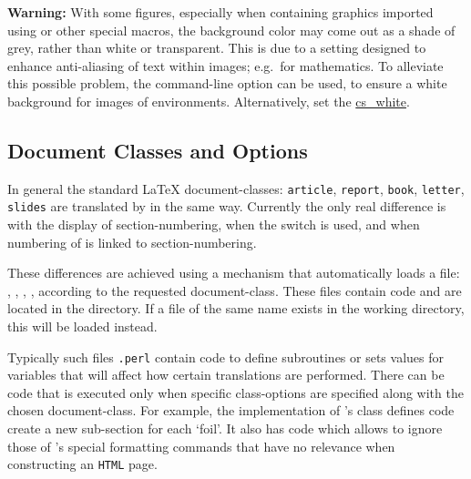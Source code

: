 \bigskip\noindent
\textbf{Warning: }
With some figures, especially when containing graphics imported using
 or other special macros, the background color
may come out as a shade of grey, rather than white or transparent.
This is due to a setting designed to enhance anti-aliasing of text
within images; e.g.\ for mathematics.
To alleviate this possible problem, the  command-line option
can be used, to ensure a white background for images of 
environments. 
Alternatively, set the  
\hyperref{variable}{variable (see section }{)}{cs_white}.


\subsection{Document Classes and Options\label{sec:cls}}
\tableofchildlinks*
{}%
In general the standard \LaTeX{} document-classes: 
\texttt{article}, \texttt{report}, \texttt{book}, \texttt{letter}, \texttt{slides}
are translated by \latextohtml{} in the same way. 
Currently the only real difference is with the display of section-numbering,
when the  switch is used,
and when numbering of  
is linked to section-numbering.

%
%

These differences are achieved using a mechanism that automatically loads a file:
, , , ,  
according to the requested document-class. 
These files contain \Perl{} code and are located in the  directory.
If a file of the same name exists in the working directory, this will be loaded
instead.

Typically such files \texttt{.perl} contain code to define subroutines 
or sets values for variables that will affect how certain translations are performed. 
There can be code that is executed only when specific class-options are specified
along with the chosen document-class.
For example, the  implementation of \FoilTeX's  class
defines code create a new sub-section for each `foil'.
It also has code which allows \latextohtml{} to ignore those of \FoilTeX's special 
formatting commands that have no relevance when constructing an \texttt{HTML} page.

\medskip 
{}%
%

